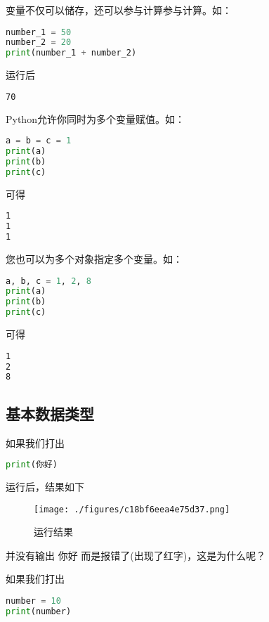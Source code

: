 变量不仅可以储存，还可以参与计算参与计算。如：

\begin{lstlisting}[language=python]
number_1 = 50
number_2 = 20
print(number_1 + number_2)
\end{lstlisting}

运行后

\begin{lstlisting}[language=bash]
70
\end{lstlisting}

Python允许你同时为多个变量赋值。如：

\begin{lstlisting}[language=python]
a = b = c = 1
print(a)
print(b)
print(c)
\end{lstlisting}

可得

\begin{lstlisting}[language=bash]
1
1
1
\end{lstlisting}

您也可以为多个对象指定多个变量。如：

\begin{lstlisting}[language=python]
a, b, c = 1, 2, 8
print(a)
print(b)
print(c)
\end{lstlisting}

可得

\begin{lstlisting}[language=bash]
1
2
8
\end{lstlisting}

\subsection{基本数据类型}

如果我们打出

\begin{lstlisting}[language=python]
print(你好)
\end{lstlisting}

运行后，结果如下

\begin{figure}[ht]
\centering
\texttt{[image: ./figures/c18bf6eea4e75d37.png]}
\caption{运行结果} \label{fig_Pyc2_7}
\end{figure}

并没有输出 你好 而是报错了(出现了红字)，这是为什么呢？

如果我们打出

\begin{lstlisting}[language=python]
number = 10
print(number)
\end{lstlisting}

